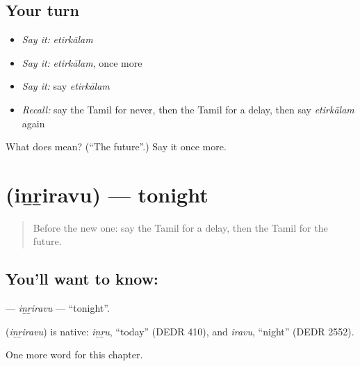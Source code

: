 \subsection*{Your turn}
\begin{itemize}
\raggedright
  \item \emph{Say it:} \emph{etirkālam}
  \item \emph{Say it:} \emph{etirkālam}, once more
  \item \emph{Say it:} say \emph{etirkālam}
  \item \emph{Recall:} say the Tamil for never, then the Tamil for a delay, then say \emph{etirkālam} again
\end{itemize}

\begin{tcolorbox}[breakable,colback=teal!4,colframe=teal!35!black,title={Before you move on}]
What does  mean? (\textquotedblleft{}The future\textquotedblright{}.) Say it once more.
\end{tcolorbox}
\section[\texorpdfstring{\ta{இன்றிரவு} (iṉṟiravu)}{இன்றிரவு (iṉṟiravu)}]{ (iṉṟiravu) — tonight}

\label{lesson:TA-C172-inriravu}



\begin{quote}
Before the new one: say the Tamil for a delay, then the Tamil for the future.
\end{quote}

\subsection*{You'll want to know: }
\textbf{} — \emph{iṉṟiravu} — \textquotedblleft{}tonight\textquotedblright{}.

\begin{cousinweb}
\textbf{} (\emph{iṉṟiravu}) is native: \emph{iṉṟu}, \textquotedblleft{}today\textquotedblright{} (DEDR 410), and \emph{iravu}, \textquotedblleft{}night\textquotedblright{} (DEDR 2552).
\end{cousinweb}

\begin{grammarlens}[title={What you've built}]
One more word for this chapter.
\end{grammarlens}

